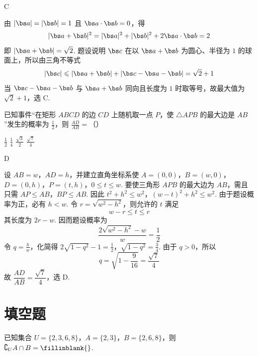 \begin{answer}
C
\end{answer}

\begin{solution}
由 \(|\bs a|=|\bs b|=1\) 且 \(\bs a\cdot\bs b=0\)，得
\[
|\bs a+\bs b|^2=|\bs a|^2+|\bs b|^2+2\bs a\cdot\bs b=2
\]
即 \(|\bs a+\bs b|=\sqrt2\). 题设说明 \(\bs c\) 在以 \(\bs a+\bs b\) 为圆心、半径为 \(1\) 的球面上，所以由三角不等式
\[
|\bs c|\leqslant|\bs a+\bs b|+|\bs c-\bs a-\bs b|=\sqrt2+1
\]
当 \(\bs c-\bs a-\bs b\) 与 \(\bs a+\bs b\) 同向且长度为 \(1\) 时取等号，故最大值为 \(\sqrt2+1\)，选 C.
\end{solution}

\begin{problem}
已知事件“在矩形 \(ABCD\) 的边 \(CD\) 上随机取一点 \(P\)，使 \(\triangle APB\) 的最大边是 \(AB\)”发生的概率为 \(\frac{1}{2}\)，则 \(\frac{AD}{AB} =\)（\quad）

\choices
    {\(\frac{1}{2}\)}
    {\(\frac{1}{4}\)}
    {\(\frac{\sqrt{3}}{2}\)}
    {\(\frac{\sqrt{7}}{4}\)}
\end{problem}

\begin{answer}
D
\end{answer}

\begin{solution}
设 \(AB=w\)，\(AD=h\)，并建立直角坐标系使
\(A=(0,0)\)，\(B=(w,0)\)，\(D=(0,h)\)，\(P=(t,h)\)，\(0\leqslant t\leqslant w\).
要使三角形 \(APB\) 的最大边为 \(AB\)，需且只需
\(AP\leqslant AB\)，\(BP\leqslant AB\).
因此
\(t^2+h^2\leqslant w^2\)，\((w-t)^2+h^2\leqslant w^2\).
由于题设概率为正，必有 \(h<w\). 令 \(r=\sqrt{w^2-h^2}\)，则允许的 \(t\) 满足
\[
w-r\leqslant t\leqslant r
\]
其长度为 \(2r-w\). 因而题设概率为
\[
\frac{2\sqrt{w^2-h^2}-w}{w}=\frac12
\]
令 \(q=\frac{h}{w}\)，化简得
\(2\sqrt{1-q^2}-1=\frac12\)，\(\sqrt{1-q^2}=\frac34\).
由于 \(q>0\)，所以
\[
q=\sqrt{1-\frac{9}{16}}=\frac{\sqrt7}{4}
\]
故 \(\dfrac{AD}{AB}=\dfrac{\sqrt7}{4}\)，选 D.
\end{solution}

\section{填空题}

\begin{problem}
已知集合 \(U = \{2, 3, 6, 8\}\)，\(A = \{2, 3\}\)，\(B = \{2, 6, 8\}\)，则 \(\complement_U A \cap B =\fillinblank{}\).
\end{problem}

